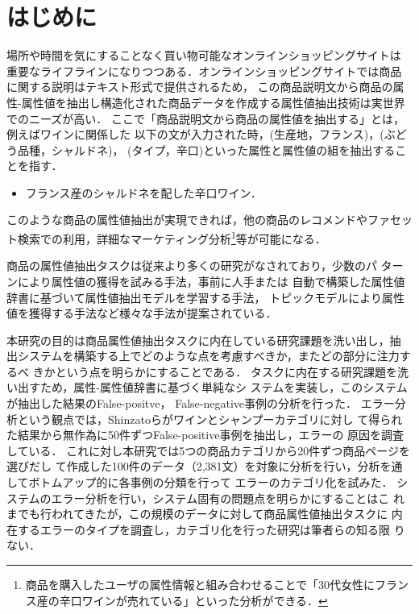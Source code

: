 \documentclass[japanese]{jnlp_1.4}
\begin{document}
\maketitle

\section{はじめに}

場所や時間を気にすることなく買い物可能なオンラインショッピングサイトは
重要なライフラインになりつつある．オンラインショッピングサイトでは商品に関する説明はテキスト形式で提供されるため，
この商品説明文から商品の属性-属性値を抽出し構造化された商品データを作成する属性値抽出技術は実世界でのニーズが高い．
ここで「商品説明文から商品の属性値を抽出する」とは，例えばワインに関係した
以下の文が入力された時，(生産地，フランス)，(ぶどう品種，シャルドネ)，
(タイプ，辛口)といった属性と属性値の組を抽出することを指す．

\begin{itemize}
\item フランス産のシャルドネを配した辛口ワイン．
\end{itemize}

\noindent このような商品の属性値抽出が実現できれば，他の商品のレコメンドやファセット検索での利用，詳細なマーケティング分析\footnote{商品を購入したユーザの属性情報と組み合わせることで「30代女性にフランス産の辛口ワインが売れている」といった分析ができる．}等が可能になる．



商品の属性値抽出タスクは従来より多くの研究がなされており，少数のパ
ターンにより属性値の獲得を試みる手法\cite{mauge2012}，事前に人手または
自動で構築した属性値辞書に基づいて属性値抽出モデルを学習する手法\cite{ghani2006,probst2007,putthividhya2011,bing2012,shinzato2013}，
トピックモデルにより属性値を獲得する手法\cite{wong2008}など様々な手法が提案されている．

本研究の目的は商品属性値抽出タスクに内在している研究課題を洗い出し，抽
出システムを構築する上でどのような点を考慮すべきか，またどの部分に注力するべ
きかという点を明らかにすることである．
タスクに内在する研究課題を洗い出すため，属性-属性値辞書に基づく単純なシ
ステムを実装し，このシステムが抽出した結果のFalse-positve，
False-negative事例の分析を行った．
エラー分析という観点では，Shinzatoらがワインとシャンプーカテゴリに対し
て得られた結果から無作為に50件ずつFalse-positive事例を抽出し，エラーの
原因を調査している\cite{shinzato2013}．
これに対し本研究では5つの商品カテゴリから20件ずつ商品ページを選びだし
て作成した100件のデータ（2,381文）を対象に分析を行い，分析を通してボトムアップ的に各事例の分類を行って
エラーのカテゴリ化を試みた．
システムのエラー分析を行い，システム固有の問題点を明らかにすることはこ
れまでも行われてきたが，この規模のデータに対して商品属性値抽出タスクに
内在するエラーのタイプを調査し，カテゴリ化を行った研究は筆者らの知る限
りない．
\end{document}
